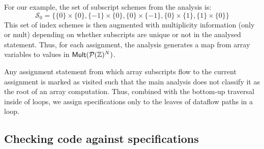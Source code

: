 For our example, the set of subscript schemes from the analysis is:
%
\begin{equation*}
\mathcal{S}_0 = \{\{0\} \times \{0\}, \{-1\} \times \{0\},
\{0\} \times \{-1\}, \{0\} \times \{1\}, \{1\} \times \{0\}\}
\end{equation*}
%
This set of index schemes is then augmented with multiplicity
information (\textsf{only} or \textsf{mult}) depending on whether
subscripts are unique or not in the analysed statement.
Thus, for each assignment, the analysis generates a map from array
variables to values in $\mathsf{Mult}(\mathcal{P}(\textnormal{$\mathbb{Z}$})^N)$.

Any assignment statement from which array subscripts flow to the
current assignment is marked as visited such that the main analysis
does not classify it as the root of an array computation.  Thus,
combined with the bottom-up traversal inside of loops, we assign
specifications only to the leaves of dataflow paths in a loop.

\subsection{Checking code against specifications}
\label{subsec:checking}

